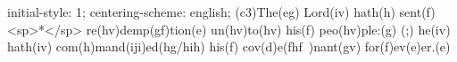 initial-style: 1;
centering-scheme: english;
(c3)The(eg) Lord(iv) hath(h) sent(f) <sp>*</sp> re(hv)demp(gf)tion(e) un(hv)to(hv) his(f) peo(hv)ple:(g) (;) he(iv) hath(iv) com(h)mand(iji)ed(hg/hih) his(f) cov(d)e(fhf~)nant(gv) for(f)ev(e)er.(e)